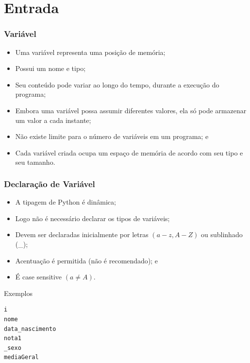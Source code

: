 \documentclass[aspectratio=169]{beamer} %
\begin{document}
\section{Entrada}

\begin{frame}
\frametitle{Variável}

\begin{itemize}
	\item Uma variável representa uma posição de memória;
	\item Possui um nome e tipo;
	\item Seu conteúdo pode variar ao longo do tempo, durante a execução do
	programa;
	\item Embora uma variável possa assumir diferentes valores, ela só pode
	armazenar um valor a cada instante;
	\item Não existe limite para o número de variáveis em um programa; e
	\item Cada variável criada ocupa um espaço de memória de acordo com seu
	tipo e seu tamanho.
\end{itemize}

\end{frame}

\begin{frame}[fragile]
\frametitle{Declaração de Variável}

\begin{itemize}
	\item A tipagem de Python é dinâmica;
	\item Logo não é necessário declarar os tipos de variáveis;
	\item Devem ser declaradas inicialmente por letras $(a - z, A - Z)$ ou sublinhado (\_);
	\item Acentuação é permitida (\alert{não é recomendado}); e
	\item É case sensitive $(a \neq A)$.
\end{itemize}\vfill

\begin{exampleblock}{Exemplos}
	\begin{lstlisting}	
i
nome
data_nascimento
nota1
_sexo
mediaGeral
	\end{lstlisting}
\end{exampleblock}
\end{frame}
\end{document}
